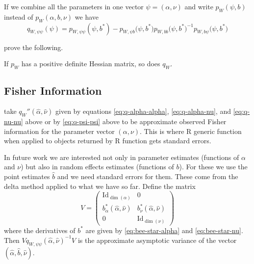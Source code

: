 If we combine all the parameters
in one vector $\psi = (\alpha, \nu)$ and write $p_W(\psi, b)$ instead
of $p_W(\alpha, b, \nu)$ we have
\begin{equation} \label{eq:q-psi-psi}
   q_{W, \psi \psi}(\psi)
   =
   p_{W, \psi \psi}(\psi, b^*)
   -
   p_{W, \psi b}\bigl(\psi, b^*\bigr)
   p_{W, b b}\bigl(\psi, b^*\bigr)^{- 1}
   p_{W, b \psi}\bigl(\psi, b^*\bigr)
\end{equation}

\citet[Section~1.8]{reaster-tr} prove the following.
\begin{theorem} \label{th:positive-definite}
If $p_W$ has a positive definite Hessian matrix, so does $q_W$.
\end{theorem}

\subsection{Fisher Information}
\label{sec:fisher-reaster}

 take $q_W''(\hat{\alpha}, \hat{\nu})$ given
by equations
\eqref{eq:q-alpha-alpha}, \eqref{eq:q-alpha-nu}, and \eqref{eq:q-nu-nu} above
or by \eqref{eq:q-psi-psi} above
to be approximate
observed Fisher information for the parameter vector $(\alpha, \nu)$.
This is where R generic function  when applied to objects
returned by R function  gets standard errors.

In future work we are interested not only in parameter estimates (functions
of $\alpha$ and $\nu$) but also in random effects estimates (functions of $b$).
For these we use the point estimates $\hat{b}$ and we need standard errors for
them.  These come from the delta method applied to what we have so far.
Define the matrix
\begin{equation} \label{eq:delta-method-for-b}
   V = \begin{pmatrix} \text{Id}_{\dim(\alpha)} & 0 \\
   b^*_\alpha(\hat{\alpha}, \hat{\nu}) & b^*_\nu(\hat{\alpha}, \hat{\nu}) \\
   0 & \text{Id}_{\dim(\nu)}
   \end{pmatrix}
\end{equation}
where the derivatives of $b^*$ are given by
\eqref{eq:bee-star-alpha} and \eqref{eq:bee-star-nu}.
Then $V q_{W, \psi \psi}(\hat{\alpha}, \hat{\nu})^{-1} V$ is the
approximate asymptotic variance of the vector
$(\hat{\alpha}, \hat{b}, \hat{\nu})$.

